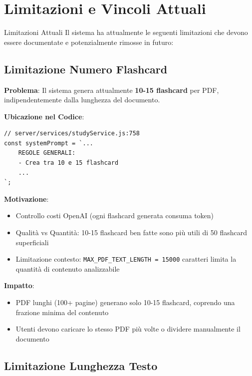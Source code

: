 \documentclass[11pt,a4paper]{article}
\begin{document}
\section{Limitazioni e Vincoli Attuali}

\begin{warningbox}{Limitazioni Attuali}
Il sistema ha attualmente le seguenti limitazioni che devono essere documentate e potenzialmente rimosse in futuro:
\end{warningbox}

\subsection{Limitazione Numero Flashcard}

\textbf{Problema}: Il sistema genera attualmente \textbf{10-15 flashcard} per PDF, indipendentemente dalla lunghezza del documento.

\textbf{Ubicazione nel Codice}:
\begin{lstlisting}[caption=Prompt OpenAI - Limitazione Flashcard]
// server/services/studyService.js:758
const systemPrompt = `...
    REGOLE GENERALI:
    - Crea tra 10 e 15 flashcard
    ...
`;
\end{lstlisting}

\textbf{Motivazione}: 
\begin{itemize}
    \item Controllo costi OpenAI (ogni flashcard generata consuma token)
    \item Qualità vs Quantità: 10-15 flashcard ben fatte sono più utili di 50 flashcard superficiali
    \item Limitazione contesto: \texttt{MAX\_PDF\_TEXT\_LENGTH = 15000} caratteri limita la quantità di contenuto analizzabile
\end{itemize}

\textbf{Impatto}: 
\begin{itemize}
    \item PDF lunghi (100+ pagine) generano solo 10-15 flashcard, coprendo una frazione minima del contenuto
    \item Utenti devono caricare lo stesso PDF più volte o dividere manualmente il documento
\end{itemize}

\subsection{Limitazione Lunghezza Testo}
\end{document}
